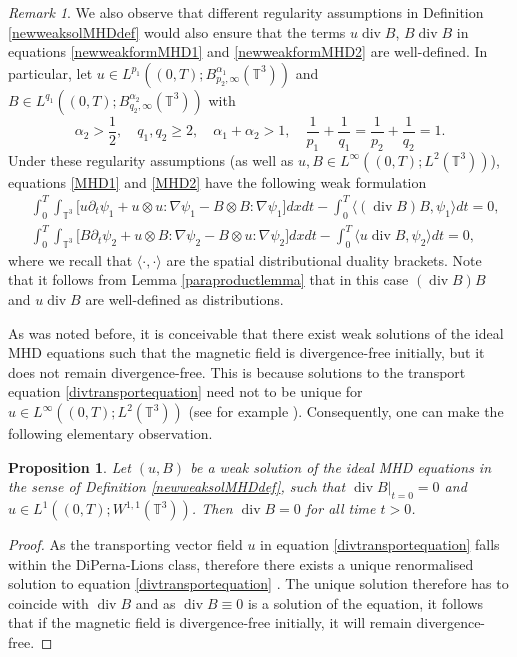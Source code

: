 \documentclass[12pt,a4paper]{article}
\newtheorem{proposition}[theorem]{Proposition}
\theoremstyle{definition}
\theoremstyle{remark}
\newtheorem{remark}[theorem]{Remark}
\numberwithin{equation}{section}
\DeclareMathOperator{\Div}{div}
\begin{document}
\begin{remark}
We also observe that different regularity assumptions in Definition \ref{newweaksolMHDdef} would also ensure that the terms $u \Div B$, $B \Div B$ in equations \eqref{newweakformMHD1} and \eqref{newweakformMHD2} are well-defined. In particular, let $u \in L^{p_1} ((0,T); B^{\alpha_1}_{p_2,\infty} (\mathbb{T}^3))$ and $B \in L^{q_1} ((0,T); B^{\alpha_2}_{q_2,\infty} (\mathbb{T}^3))$ with
\begin{equation*}
\alpha_2 > \frac{1}{2}, \quad q_1, q_2 \geq 2, \quad \alpha_1 + \alpha_2 > 1, \quad \frac{1}{p_1} + \frac{1}{q_1} = \frac{1}{p_2} + \frac{1}{q_2} = 1.
\end{equation*}
Under these regularity assumptions (as well as $u, B \in L^\infty ((0,T); L^2 (\mathbb{T}^3))$), equations \eqref{MHD1} and \eqref{MHD2} have the following weak formulation
\begin{align}
&\int_0^T \int_{\mathbb{T}^3} \bigg[ u \partial_t \psi_1 + u \otimes u : \nabla \psi_1 - B \otimes B : \nabla \psi_1 \bigg] dx dt - \int_0^T \langle (\Div B ) B , \psi_1 \rangle dt = 0, \\
&\int_0^T \int_{\mathbb{T}^3} \bigg[ B \partial_t \psi_2 + u \otimes B : \nabla \psi_2 - B \otimes u : \nabla \psi_2  \bigg] dx dt - \int_0^T \langle u \Div B , \psi_2 \rangle dt = 0,
\end{align}
where we recall that $\langle \cdot, \cdot \rangle$ are the spatial distributional duality brackets. Note that it follows from Lemma \ref{paraproductlemma} that in this case $(\Div B) B$ and $u \Div B$ are well-defined as distributions.
\end{remark}
As was noted before, it is conceivable that there exist weak solutions of the ideal MHD equations such that the magnetic field is divergence-free initially, but it does not remain divergence-free. This is because solutions to the transport equation \eqref{divtransportequation} need not to be unique for $u \in L^\infty ((0,T); L^2 (\mathbb{T}^3))$ (see for example \cite{huysmans}). Consequently, one can make the following elementary observation.
\begin{proposition}
Let $(u,B)$ be a weak solution of the ideal MHD equations in the sense of Definition \ref{newweaksolMHDdef}, such that $\Div B \lvert_{t = 0} = 0$ and $u \in L^1 ((0,T); W^{1,1} (\mathbb{T}^3))$. Then $\Div B = 0$ for all time $t > 0$.
\end{proposition}
\begin{proof}
As the transporting vector field $u$ in equation \eqref{divtransportequation} falls within the DiPerna-Lions class, therefore there exists a unique renormalised solution to equation \eqref{divtransportequation} \cite{diperna}. The unique solution therefore has to coincide with $\Div B$ and as $\Div B \equiv 0$ is a solution of the equation, it follows that if the magnetic field is divergence-free initially, it will remain divergence-free. 
\end{proof}
\end{document}
